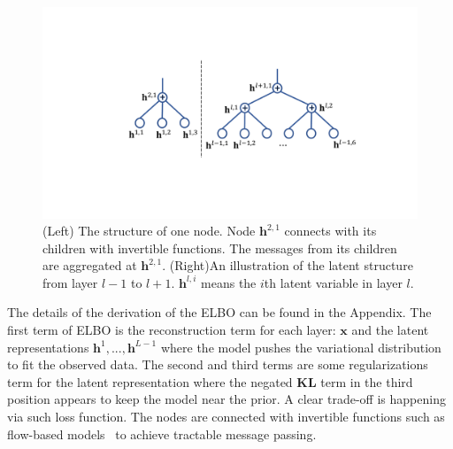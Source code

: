\documentclass{article} %
\begin{document}
\begin{figure}
\begin{center}
 \includegraphics[width=1.0\linewidth]{fig/node.pdf}
\end{center}
\vspace{-0.2in}
\caption{ {\small (Left) The structure of one node. Node $\mathbf{h}^{2,1}$ connects with its children with invertible functions. The messages from its children are aggregated at $\mathbf{h}^{2,1}$.   (Right)An illustration of the latent structure from layer $l-1$ to $l+1$.  $\mathbf{h}^{l, i}$ means the $i$th latent variable  in layer $l$.}}
\label{fig:node_tree}
\vspace{-0.15in}
\end{figure}
The details of the derivation of the ELBO can be found in the Appendix. 
The first term of ELBO is the reconstruction term for each layer: $\mathbf{x}$ and the latent representations $\mathbf{h}^1, ..., \mathbf{h}^{L-1}$ where the model pushes the variational distribution to fit the observed data. 
The second and third terms are some regularizations term for the latent representation where the negated \textbf{KL} term in the third position appears to keep the model near the prior. A clear trade-off is happening via such loss function.
The nodes are connected with invertible functions such as flow-based models~\citep{Dinh2016DensityEU} to achieve tractable message passing. 
\end{document}

